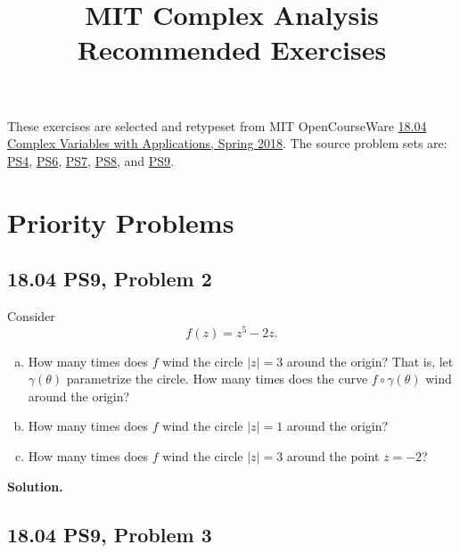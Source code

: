 \documentclass{article}
\title{\textbf{MIT Complex Analysis Recommended Exercises}}
\author{}
\date{}
\newenvironment{solution}{%
  \par\medskip\noindent\textbf{Solution.}\par
}{\par\medskip}
\begin{document}
\maketitle

\noindent
These exercises are selected and retypeset from MIT OpenCourseWare
\href{https://ocw.mit.edu/courses/18-04-complex-variables-with-applications-spring-2018/}{18.04 Complex Variables with Applications, Spring 2018}.
The source problem sets are:
\href{https://ocw.mit.edu/courses/18-04-complex-variables-with-applications-spring-2018/mit18_04_s18_pset04.pdf}{PS4},
\href{https://ocw.mit.edu/courses/18-04-complex-variables-with-applications-spring-2018/mit18_04_s18_pset06.pdf}{PS6},
\href{https://ocw.mit.edu/courses/18-04-complex-variables-with-applications-spring-2018/mit18_04_s18_pset07.pdf}{PS7},
\href{https://ocw.mit.edu/courses/18-04-complex-variables-with-applications-spring-2018/mit18_04_s18_pset08.pdf}{PS8}, and
\href{https://ocw.mit.edu/courses/18-04-complex-variables-with-applications-spring-2018/mit18_04_s18_pset09.pdf}{PS9}.

\section{Priority Problems}

\subsection*{18.04 PS9, Problem 2}

Consider
\[
  f(z)=z^5-2z.
\]
\begin{enumerate}[(a)]
  \item How many times does $f$ wind the circle $|z|=3$ around the origin?
  That is, let $\gamma(\theta)$ parametrize the circle. How many times does
  the curve $f\circ\gamma(\theta)$ wind around the origin?

  \item How many times does $f$ wind the circle $|z|=1$ around the origin?

  \item How many times does $f$ wind the circle $|z|=3$ around the point
  $z=-2$?
\end{enumerate}

\begin{solution}
\end{solution}

\subsection*{18.04 PS9, Problem 3}
\end{document}
